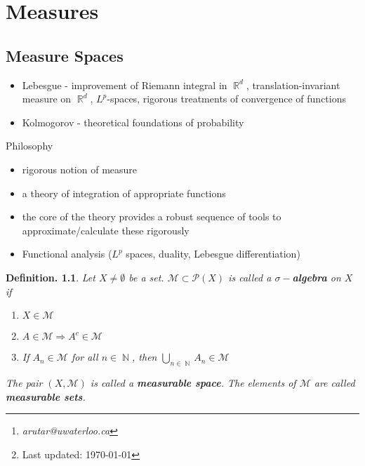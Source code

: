 \documentclass[11pt, a4paper]{memoir}
\title{\subject}
\author{Alex Rutar\thanks{\itshape arutar@uwaterloo.ca}\\ University of Waterloo}
\date{\semester\thanks{Last updated: \today}}
\DeclareMathOperator{\N}{{\mathbb{N}}}
\DeclareMathOperator{\R}{{\mathbb{R}}}
\theoremstyle{change}
\theoremstyle{plain}
\theoremstyle{nonumberplain}
\newtheorem{definition}{Definition.}
\begin{document}
\hypersetup{pageanchor=false}
\maketitle
\newpage
\frontmatter
\hypersetup{pageanchor=true}
\tableofcontents*
\newpage
\mainmatter


\chapter{Measures}
\section{Measure Spaces}
\begin{itemize}
    \item Lebesgue - improvement of Riemann integral in $\R^d$, translation-invariant measure on $\R^d$, $L^p$-spaces, rigorous treatments of convergence of functions
    \item Kolmogorov - theoretical foundations of probability
\end{itemize}
Philosophy
\begin{itemize}
    \item rigorous notion of measure
    \item a theory of integration of appropriate functions
    \item the core of the theory provides a robust sequence of tools to approximate/calculate these rigorously
    \item Functional analysis ($L^p$ spaces, duality, Lebesgue differentiation)
\end{itemize}
\begin{definition}
    Let $X\neq\emptyset$ be a set.
    $\mathcal{M}\subset\mathcal{P}(X)$ is called a \textbf{$\sigma-$algebra} on $X$ if
    \begin{enumerate}[nolistsep]
        \item $X\in \mathcal{M}$
        \item $A\in\mathcal{M}\Rightarrow A^c\in\mathcal{M}$
        \item If $A_n\in\mathcal{M}$ for all $n\in\N$, then $\bigcup\limits_{n\in\N}A_n\in\mathcal{M}$
    \end{enumerate}
    The pair $(X,\mathcal{M})$ is called a \textbf{measurable space}.
    The elements of $\mathcal{M}$ are called \textbf{measurable sets}.
\end{definition}
\end{document}
